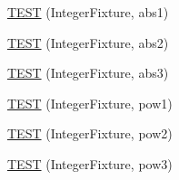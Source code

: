 \begin{DoxyCompactItemize}
\hyperlink{_test_integer_8c_09_09_a17d2e19e3ee00f0ed7155677e1b154a6}{T\-E\-S\-T} (Integer\-Fixture, abs1)
\item 
\hyperlink{_test_integer_8c_09_09_a7504320f0b9dd100aec4822556a0598a}{T\-E\-S\-T} (Integer\-Fixture, abs2)
\item 
\hyperlink{_test_integer_8c_09_09_ae4016846ce98202c9b9bb37d2c139028}{T\-E\-S\-T} (Integer\-Fixture, abs3)
\item 
\hyperlink{_test_integer_8c_09_09_ac1f98278a1a88743082f3a97e5180a2e}{T\-E\-S\-T} (Integer\-Fixture, pow1)
\item 
\hyperlink{_test_integer_8c_09_09_ac2880cab72f5b9dd22bba9b7dc6c7c4b}{T\-E\-S\-T} (Integer\-Fixture, pow2)
\item 
\hyperlink{_test_integer_8c_09_09_a3bf1a95e5c364f3cf8dd3a2ebbf4a455}{T\-E\-S\-T} (Integer\-Fixture, pow3)
\end{DoxyCompactItemize}


